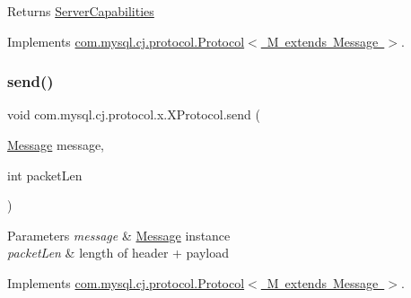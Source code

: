 \begin{DoxyReturn}{Returns}
\mbox{\hyperlink{interfacecom_1_1mysql_1_1cj_1_1protocol_1_1_server_capabilities}{Server\+Capabilities}} 
\end{DoxyReturn}


Implements \mbox{\hyperlink{interfacecom_1_1mysql_1_1cj_1_1protocol_1_1_protocol_ac7608c87247ae3467a9f1e3e8c254042}{com.\+mysql.\+cj.\+protocol.\+Protocol$<$ M extends Message $>$}}.

\mbox{\label{classcom_1_1mysql_1_1cj_1_1protocol_1_1x_1_1_x_protocol_ac6e989e8d119f8c1efd0fda253199727}} 
\subsubsection{\texorpdfstring{send()}{send()}}
{\footnotesize\ttfamily void com.\+mysql.\+cj.\+protocol.\+x.\+X\+Protocol.\+send (\begin{DoxyParamCaption}\item[{\mbox{\hyperlink{interfacecom_1_1mysql_1_1cj_1_1protocol_1_1_message}{Message}}}]{message,  }\item[{int}]{packet\+Len }\end{DoxyParamCaption})}


\begin{DoxyParams}{Parameters}
{\em message} & \mbox{\hyperlink{interfacecom_1_1mysql_1_1cj_1_1protocol_1_1_message}{Message}} instance \\
\hline
{\em packet\+Len} & length of header + payload \\
\hline
\end{DoxyParams}


Implements \mbox{\hyperlink{interfacecom_1_1mysql_1_1cj_1_1protocol_1_1_protocol_ae917ec7bc23dc3244bea8e745318c725}{com.\+mysql.\+cj.\+protocol.\+Protocol$<$ M extends Message $>$}}.

\mbox{\label{classcom_1_1mysql_1_1cj_1_1protocol_1_1x_1_1_x_protocol_a0ecabba038f9c769909e05a53d6c9657}} 
